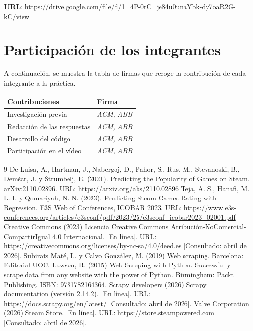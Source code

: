 \documentclass[
]{article}
\begin{document}
\textbf{URL}: \url{https://drive.google.com/file/d/1_4P-0rC_je84u0unaYbk-dy7oaR2G-kC/view}
\newpage

\section*{Participación de los
integrantes}\label{participaciuxf3n-de-los-integrantes}

{\renewcommand{\arraystretch}{1.8}
\setlength{\arrayrulewidth}{1pt}

A continuación, se muestra la tabla de firmas que recoge la contribución de cada integrante a la práctica.

\vspace{0.4cm}
\begin{tabularx}{\linewidth}{|>{\centering\arraybackslash}X|>{\centering\arraybackslash}X|}
  \hline
  \rowcolor{bluetext!20}
  \textbf{Contribuciones} & \textbf{Firma} \\
  \hline
  Investigación previa & \textit{ACM, ABB} \\
  \hline
  Redacción de las respuestas & \textit{ACM, ABB} \\
  \hline
  Desarrollo del código & \textit{ACM, ABB} \\
  \hline
  Participación en el vídeo & \textit{ACM, ABB} \\
  \hline
\end{tabularx}}

\vspace{0.5cm}

\begin{thebibliography}{9}\label{ref:Ref}
   De Luisa, A., Hartman, J., Nabergoj, D., Pahor, S., Rus, M., Stevanoski, B., Demšar, J. y Štrumbelj, E. (2021). Predicting the Popularity of Games on Steam. arXiv:2110.02896. URL: \url{https://arxiv.org/abs/2110.02896}
   Teja, A. S., Hanafi, M. L. I. y Qomariyah, N. N. (2023). Predicting Steam Games Rating with Regression. E3S Web of Conferences, ICOBAR 2023. URL: \url{https://www.e3s-conferences.org/articles/e3sconf/pdf/2023/25/e3sconf_icobar2023_02001.pdf}
   Creative Commons (2023) Licencia Creative Commons Atribución-NoComercial-CompartirIgual 4.0 Internacional. [En línea]. URL: \url{https://creativecommons.org/licenses/by-nc-sa/4.0/deed.es} [Consultado: abril de 2026].
   Subirats Maté, L. y Calvo González, M. (2019) Web scraping. Barcelona: Editorial UOC.
   Lawson, R. (2015) Web Scraping with Python: Successfully scrape data from any website with the power of Python. Birmingham: Packt Publishing. ISBN: 9781782164364.
   Scrapy developers (2026) Scrapy documentation (versión 2.14.2). [En línea]. URL: \url{https://docs.scrapy.org/en/latest/} [Consultado: abril de 2026].
   Valve Corporation (2026) Steam Store. [En línea]. URL: \url{https://store.steampowered.com} [Consultado: abril de 2026].
\end{thebibliography}
\end{document}
